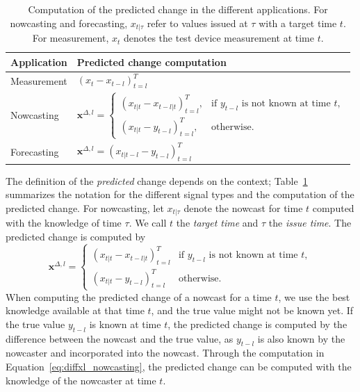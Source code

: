 \documentclass[pdflatex]{sn-jnl}
\theoremstyle{plain}%
\theoremstyle{definition}
\newcommand{\diffxl}{\mathbf{x}^{\Delta,l}}
\begin{document}
\begin{table}
    \centering
    \scriptsize
    \begin{tabular}{l l}
        \toprule
        Application & Predicted change computation \\
        \midrule
        Measurement & $(x_{t} - x_{t-l})_{t=l}^T $\\
        Nowcasting & $
\diffxl =
\begin{cases}
(x_{t|t} - x_{t-l|t})^T_{t=l}, & \text{if } y_{t-l} \text{ is not known at time } t, \\
(x_{t|t} - y_{t-l})^T_{t=l}, & \text{otherwise}.
\end{cases}
$ \\
        Forecasting & $ \diffxl = (x_{t|t-l} - y_{t-l})^T_{t=l}$\\
        \bottomrule
    \end{tabular}
    \caption[Computation of the predicted change in the different applications.]{Computation of the predicted change in the different applications. For nowcasting and forecasting, $x_{t | \tau}$ refer to values issued at $\tau$ with a target time $t$. For measurement, $x_t$ denotes the test device measurement at time $t$.}
    \label{tab:notation}
\end{table}

The definition of the \textit{predicted} change depends on the context;
Table~\ref{tab:notation} summarizes the notation for the different signal types and the computation of the predicted change.
For nowcasting, let $x_{t | \tau}$ denote the nowcast for time $t$ computed with the knowledge of time $\tau$.
We call $t$ the \textit{target time} and $\tau$ the \textit{issue time}.
The predicted change is computed by
\begin{equation}
  \diffxl =
\begin{cases}
(x_{t|t} - x_{t-l|t})^T_{t=l} & \text{if } y_{t-l} \text{ is not known at time } t, \\
(x_{t|t} - y_{t-l})^T_{t=l} & \text{otherwise}.
\end{cases} \label{eq:diffxl_nowcasting}
\end{equation}
When computing the predicted change of a nowcast for a time $t$, we use the best knowledge available at that time $t$, and the true value might not be known yet.
If the true value $y_{t-l}$ is known at time $t$, the predicted change is computed by the difference between the nowcast and the true value, as $y_{t-l}$ is also known by the nowcaster and incorporated into the nowcast.
Through the computation in Equation~\eqref{eq:diffxl_nowcasting}, the predicted change can be computed with the knowledge of the nowcaster at time $t$.
\end{document}
